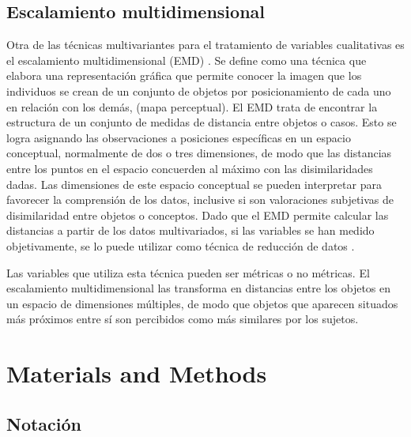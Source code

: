 \documentclass[water,article,submit,moreauthors,pdftex]{mdpi}
\begin{document}
\hypertarget{escalamiento-multidimensional}{%
\subsection{Escalamiento
multidimensional}\label{escalamiento-multidimensional}}

Otra de las técnicas multivariantes para el tratamiento de variables
cualitativas es el escalamiento multidimensional (EMD)
\citep{torgerson1952, shepard1962}. Se define como una técnica que
elabora una representación gráfica que permite conocer la imagen que los
individuos se crean de un conjunto de objetos por posicionamiento de
cada uno en relación con los demás, (mapa perceptual). El EMD trata de
encontrar la estructura de un conjunto de medidas de distancia entre
objetos o casos. Esto se logra asignando las observaciones a posiciones
específicas en un espacio conceptual, normalmente de dos o tres
dimensiones, de modo que las distancias entre los puntos en el espacio
concuerden al máximo con las disimilaridades dadas. Las dimensiones de
este espacio conceptual se pueden interpretar para favorecer la
comprensión de los datos, inclusive si son valoraciones subjetivas de
disimilaridad entre objetos o conceptos. Dado que el EMD permite
calcular las distancias a partir de los datos multivariados, si las
variables se han medido objetivamente, se lo puede utilizar como técnica
de reducción de datos \citep{perez2004}.

Las variables que utiliza esta técnica pueden ser métricas o no
métricas. El escalamiento multidimensional las transforma en distancias
entre los objetos en un espacio de dimensiones múltiples, de modo que
objetos que aparecen situados más próximos entre sí son percibidos como
más similares por los sujetos.

\hypertarget{materials-and-methods}{%
\section{Materials and Methods}\label{materials-and-methods}}

\hypertarget{notaciuxf3n}{%
\subsection{Notación}\label{notaciuxf3n}}
\end{document}
